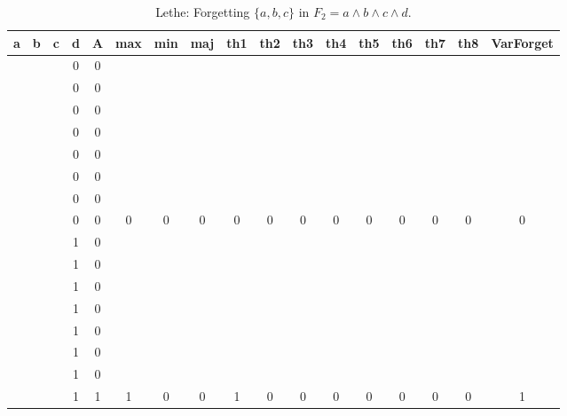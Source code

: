 \begin{table}[!tb]
    \centering
    \begin{tabular}{|c|c|c|c|c|c|c|c|c|c|c|c|c|c|c|c|c|}
        \hline
        \textbf{a} & \textbf{b} & \textbf{c} & \textbf{d} & \textbf{A} & \textbf{max} & \textbf{min} & \textbf{maj} & \textbf{th1} & \textbf{th2} & \textbf{th3} & \textbf{th4} & \textbf{th5} & \textbf{th6} & \textbf{th7} & \textbf{th8} & \textbf{VarForget} \\ \hline
        \rowcolor{gray!40}  &  &  & 0 & 0 &  &  &  &  &  &  &  &  &  &  &  &  \\ \hline
        \rowcolor{gray!40}  &  &  & 0 & 0 &  &  &  &  &  &  &  &  &  &  &  &  \\ \hline
        \rowcolor{gray!40}  &  &  & 0 & 0 &  &  &  &  &  &  &  &  &  &  &  &  \\ \hline
        \rowcolor{gray!40}  &  &  & 0 & 0 &  &  &  &  &  &  &  &  &  &  &  &  \\ \hline
        \rowcolor{gray!40}  &  &  & 0 & 0 &  &  &  &  &  &  &  &  &  &  &  &  \\ \hline
        \rowcolor{gray!40}  &  &  & 0 & 0 &  &  &  &  &  &  &  &  &  &  &  &  \\ \hline
        \rowcolor{gray!40}  &  &  & 0 & 0 &  &  &  &  &  &  &  &  &  &  &  &  \\ \hline
        \rowcolor{gray!40}  &  &  & 0 & 0 & 0 & 0 & 0 & 0 & 0 & 0 & 0 & 0 & 0 & 0 & 0 & 0 \\ \hline
        \rowcolor{blue!40}  &  &  & 1 & 0 &  &  &  &  &  &  &  &  &  &  &  &  \\ \hline
        \rowcolor{blue!40}  &  &  & 1 & 0 &  &  &  &  &  &  &  &  &  &  &  &  \\ \hline
        \rowcolor{blue!40}  &  &  & 1 & 0 &  &  &  &  &  &  &  &  &  &  &  &  \\ \hline
        \rowcolor{blue!40}  &  &  & 1 & 0 &  &  &  &  &  &  &  &  &  &  &  &  \\ \hline
        \rowcolor{blue!40}  &  &  & 1 & 0 &  &  &  &  &  &  &  &  &  &  &  &  \\ \hline
        \rowcolor{blue!40}  &  &  & 1 & 0 &  &  &  &  &  &  &  &  &  &  &  &  \\ \hline
        \rowcolor{blue!40}  &  &  & 1 & 0 &  &  &  &  &  &  &  &  &  &  &  &  \\ \hline
        \rowcolor{blue!40}  &  &  & 1 & 1 & 1 & 0 & 0 & 1 & 0 & 0 & 0 & 0 & 0 & 0 & 0 & 1 \\ \hline
    \end{tabular}
    \caption{Lethe: Forgetting $\{a, b, c\}$ in $F_{2} = a \land b \land c \land d$.}
    \label{tab:lethe-F2-abc}
\end{table}
